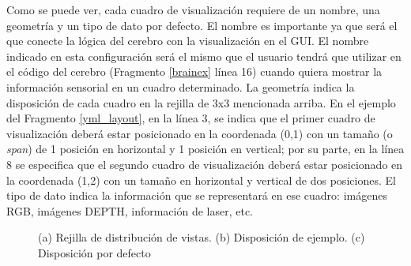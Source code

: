 Como se puede ver, cada cuadro de visualización requiere de un nombre, una geometría y un tipo de dato por defecto. El nombre es importante ya que será el que conecte la lógica del cerebro con la visualización en el GUI. El nombre indicado en esta configuración será el mismo que el usuario tendrá que utilizar en el código del cerebro (Fragmento \ref{brainex} línea 16) cuando quiera mostrar la información sensorial en un cuadro determinado. La geometría indica la disposición de cada cuadro en la rejilla de 3x3 mencionada arriba. En el ejemplo del Fragmento \ref{yml_layout}, en la línea 3, se indica que el primer cuadro de visualización deberá estar posicionado en la coordenada (0,1) con un tamaño (o \textit{span}) de 1 posición en horizontal y 1 posición en vertical; por su parte, en la línea 8 se especifica que el segundo cuadro de visualización deberá estar posicionado en la coordenada (1,2) con un tamaño en horizontal y vertical de dos posiciones. El tipo de dato indica la información que se representará en ese cuadro: imágenes RGB, imágenes DEPTH, información de laser, etc.

\begin{figure}
	\begin{center}
		\hspace{0.1cm}
		\hspace{0.1cm}
	\end{center}	
	\centering
	\captionsetup{justification=centering,margin=0.1cm}
	\caption{(a) Rejilla de distribución de vistas. (b) Disposición de ejemplo. (c) Disposición por defecto }
	\label{fig:matrix_layout}
\end{figure}

